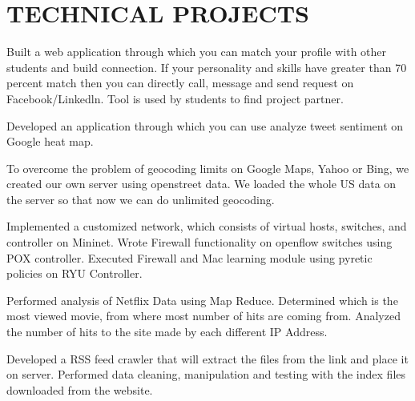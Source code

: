 \documentclass[letterpaper]{deedy-resume} %
\begin{document}
\begin{minipage}[t]{0.66\textwidth}
\sectionspace %


\section{TECHNICAL PROJECTS}

Built a web application through which you can match your profile with other students and build connection. If your personality and skills have greater than 70 percent match then you can directly call, message and send request on Facebook/Linkedln. Tool is used by students to find project partner.   
\sectionspace %


Developed an application through which you can use analyze tweet sentiment on Google heat map.
\sectionspace %

To overcome the problem of geocoding limits on Google Maps, Yahoo or Bing, we created our own server using openstreet data. We loaded the whole US data on the server so that now we can do unlimited geocoding.
\sectionspace %

Implemented a customized network, which consists of virtual hosts, switches, and controller on Mininet. Wrote Firewall functionality on openflow switches using POX controller. Executed Firewall and Mac learning module using pyretic policies on RYU Controller.
\sectionspace %

Performed analysis of Netflix Data using Map Reduce. Determined which is the most viewed movie, from where most number of hits are coming from. Analyzed the number of hits to the site made by each different IP Address.
\sectionspace %

Developed a RSS feed crawler that will extract the files from the link and place it on server. Performed data cleaning, manipulation and testing with the index files downloaded from the website.
\sectionspace %


\end{minipage}
\end{document}
